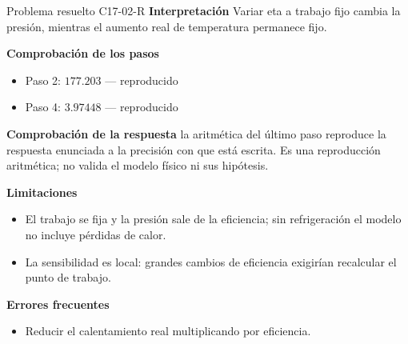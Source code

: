 \documentclass[10pt,openany]{book}
\begin{document}
\begin{studiumworked}{Problema resuelto C17-02-R}
\noindent\textbf{Interpretación}
Variar eta a trabajo fijo cambia la presión, mientras el aumento real de temperatura permanece fijo.

\noindent\textbf{Comprobación de los pasos}
\begin{itemize}
\item Paso 2: $177.203$ — reproducido
\item Paso 4: $3.97448$ — reproducido
\end{itemize}

\noindent\textbf{Comprobación de la respuesta} la aritmética del último paso reproduce la respuesta enunciada a la precisión con que está escrita. Es una reproducción aritmética; no valida el modelo físico ni sus hipótesis.

\noindent\textbf{Limitaciones}
\begin{itemize}
\item El trabajo se fija y la presión sale de la eficiencia; sin refrigeración el modelo no incluye pérdidas de calor.
\item La sensibilidad es local: grandes cambios de eficiencia exigirían recalcular el punto de trabajo.
\end{itemize}

\noindent\textbf{Errores frecuentes}
\begin{itemize}
\item Reducir el calentamiento real multiplicando por eficiencia.
\end{itemize}
\end{studiumworked}
\end{document}
